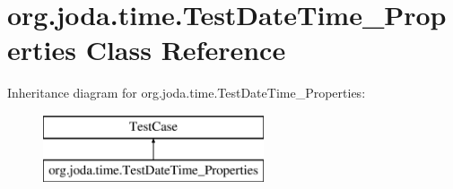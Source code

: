 \hypertarget{classorg_1_1joda_1_1time_1_1_test_date_time___properties}{\section{org.\-joda.\-time.\-Test\-Date\-Time\-\_\-\-Properties Class Reference}
\label{classorg_1_1joda_1_1time_1_1_test_date_time___properties}
}
Inheritance diagram for org.\-joda.\-time.\-Test\-Date\-Time\-\_\-\-Properties\-:\begin{figure}[H]
\begin{center}
\leavevmode
\includegraphics[height=2.000000cm]{classorg_1_1joda_1_1time_1_1_test_date_time___properties}
\end{center}
\end{figure}

